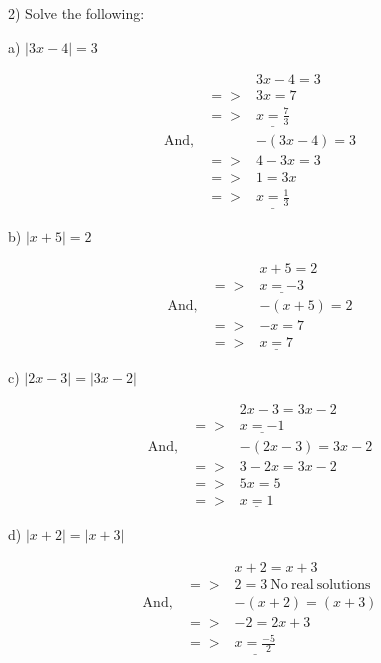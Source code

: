 \documentclass[11pt]{article}
\begin{document}
\begin{flushleft} 2) Solve the following: \end{flushleft}

\begin{flushleft} a) $\displaystyle{|3x-4|=3} $ \end{flushleft}
\begin{eqnarray*}
&&3x-4=3\\
&=>&3x=7\\
&=>&\underline{x=\frac{7}{3}}\\
\mathrm{And,}&&-(3x-4)=3\\
&=>&4-3x=3\\
&=>&1=3x\\
&=>&\underline{x=\frac{1}{3}}
\end{eqnarray*}

\begin{flushleft} b) $\displaystyle{|x+5|=2} $ \end{flushleft}
\begin{eqnarray*}
&&x+5=2\\
&=>&\underline{x=-3}\\
\mathrm{And,}&&-(x+5)=2\\
&=>&-x=7\\
&=>&\underline{x=7}
\end{eqnarray*}

\begin{flushleft} c) $\displaystyle{|2x-3|=|3x-2|} $ \end{flushleft}
\begin{eqnarray*}
&&2x-3=3x-2\\
&=>&\underline{x=-1}\\
\mathrm{And,}&&-(2x-3)=3x-2\\
&=>&3-2x=3x-2\\
&=>&5x=5\\
&=>&\underline{x=1}
\end{eqnarray*}

\begin{flushleft} d) $\displaystyle{|x+2|=|x+3|} $ \end{flushleft}
\begin{eqnarray*}
&&x+2=x+3\\
&=>&2=3\mathrm{\ No\ real\ solutions}\\
\mathrm{And,}&&-(x+2)=(x+3)\\
&=>&-2=2x+3\\
&=>&\underline{x=\frac{-5}{2}}
\end{eqnarray*}
\end{document}
